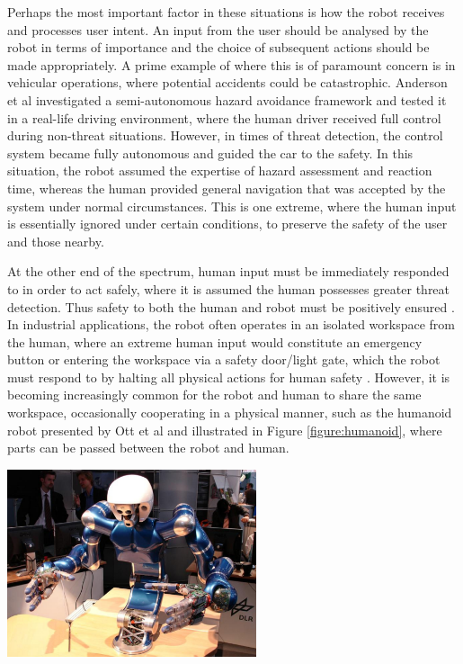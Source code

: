 \documentclass[11pt]{article}
\begin{document}
Perhaps the most important factor in these situations is how the robot receives and processes user intent. An input from the user should be analysed by the robot in terms of importance and the choice of subsequent actions should be made appropriately. A prime example of where this is of paramount concern is in vehicular operations, where potential accidents could be catastrophic. Anderson et al \cite{Anderson2010} investigated a semi-autonomous hazard avoidance framework and tested it in a real-life driving environment, where the human driver received full control during non-threat situations. However, in times of threat detection, the control system became fully autonomous and guided the car to the safety. In this situation, the robot assumed the expertise of hazard assessment and reaction time, whereas the human provided general navigation that was accepted by the system under normal circumstances. This is one extreme, where the human input is essentially ignored under certain conditions, to preserve the safety of the user and those nearby. 

At the other end of the spectrum, human input must be immediately responded to in order to act safely, where it is assumed the human possesses greater threat detection. Thus safety to both the human and robot must be positively ensured \cite{Haddadin2007}. In industrial applications, the robot often operates in an isolated workspace from the human, where an extreme human input would constitute an emergency button or entering the workspace via a safety door/light gate, which the robot must respond to by halting all physical actions for human safety \cite{ISOGuards}. However, it is becoming increasingly common for the robot and human to share the same workspace, occasionally cooperating in a physical manner, such as the humanoid robot presented by Ott et al \cite{Ott2006} and illustrated in Figure \ref{figure:humanoid}, where parts can be passed between the robot and human.

\begin{center}
\includegraphics[width=0.55\textwidth]{humanoid.png}
\label{figure:humanoid}
\end{center}
\end{document}
